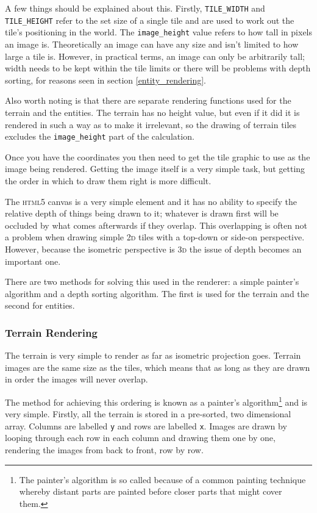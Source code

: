 A few things should be explained about this. Firstly, \texttt{TILE\_WIDTH} and \texttt{TILE\_HEIGHT} refer to the set size of a single tile and are used to work out the tile's positioning in the world. The \texttt{image\_height} value refers to how tall in pixels an image is. Theoretically an image can have any size and isn't limited to how large a tile is. However, in practical terms, an image can only be arbitrarily tall; width needs to be kept within the tile limits or there will be problems with depth sorting, for reasons seen in section \ref{entity_rendering}.


Also worth noting is that there are separate rendering functions used for the terrain and the entities. The terrain has no height value, but even if it did it is rendered in such a way as to make it irrelevant, so the drawing of terrain tiles excludes the \texttt{image\_height} part of the calculation.

Once you have the coordinates you then need to get the tile graphic to use as the image being rendered. Getting the image itself is a very simple task, but getting the order in which to draw them right is more difficult.

The \textsc{html5} canvas is a very simple element and it has no ability to specify the relative depth of things being drawn to it; whatever is drawn first will be occluded by what comes afterwards if they overlap. This overlapping is often not a problem when drawing simple \textsc{2d} tiles with a top-down or side-on perspective. However, because the isometric perspective is \textsc{3d} the issue of depth becomes an important one.


There are two methods for solving this used in the renderer: a simple painter's algorithm and a depth sorting algorithm. The first is used for the terrain and the second for entities.

\subsubsection{Terrain Rendering}
The terrain is very simple to render as far as isometric projection goes. Terrain images are the same size as the tiles, which means that as long as they are drawn in order the images will never overlap.

The method for achieving this ordering is known as a painter's algorithm\footnote{The painter's algorithm is so called because of a common painting technique whereby distant parts are painted before closer parts that might cover them.} and is very simple. Firstly, all the terrain is stored in a pre-sorted, two dimensional array. Columns are labelled \texttt{y} and rows are labelled \texttt{x}. Images are drawn by looping through each row in each column and drawing them one by one, rendering the images from back to front, row by row.

